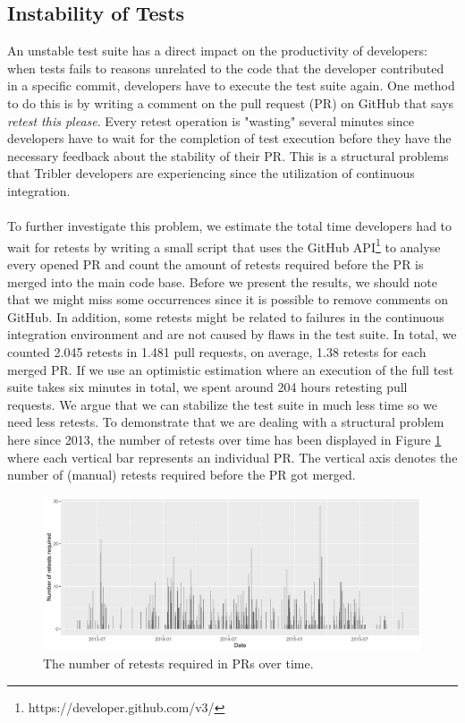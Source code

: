 \subsection{Instability of Tests}
\label{subsec:instability-tests}
An unstable test suite has a direct impact on the productivity of developers: when tests fails to reasons unrelated to the code that the developer contributed in a specific commit, developers have to execute the test suite again. One method to do this is by writing a comment on the pull request (PR) on GitHub that says \emph{retest this please}. Every retest operation is "wasting" several minutes since developers have to wait for the completion of test execution before they have the necessary feedback about the stability of their PR. This is a structural problems that Tribler developers are experiencing since the utilization of continuous integration.\\\\
To further investigate this problem, we estimate the total time developers had to wait for retests by writing a small script that uses the GitHub API\footnote{https://developer.github.com/v3/} to analyse every opened PR and count the amount of retests required before the PR is merged into the main code base. Before we present the results, we should note that we might miss some occurrences since it is possible to remove comments on GitHub. In addition, some retests might be related to failures in the continuous integration environment and are not caused by flaws in the test suite. In total, we counted 2.045 retests in 1.481 pull requests, on average, 1.38 retests for each merged PR. If we use an optimistic estimation where an execution of the full test suite takes six minutes in total, we spent around 204 hours retesting pull requests. We argue that we can stabilize the test suite in much less time so we need less retests. To demonstrate that we are dealing with a structural problem here since 2013, the number of retests over time has been displayed in Figure \ref{fig:retest-this-please-required} where each vertical bar represents an individual PR. The vertical axis denotes the number of (manual) retests required before the PR got merged.\\

\begin{figure}[h!]
	\centering
	\includegraphics[width=1.0\columnwidth]{images/improving_qa/retests_required}
	\caption{The number of retests required in PRs over time.}
	\label{fig:retest-this-please-required}
\end{figure}

